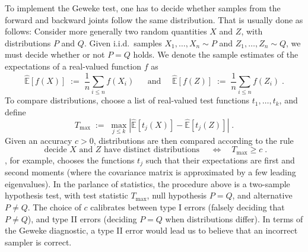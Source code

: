 \documentclass{article}
\begin{document}
To implement the Geweke test, one has to decide whether samples from the forward
and backward joints follow the same distribution. That is usually done as
follows: Consider more generally two 
random quantities $X$ and $Z$, with distributions $P$ and $Q$.
Given i.i.d.\ samples
${X_1,\ldots,X_n\sim P}$ and ${Z_1,\ldots,Z_n\sim Q}$, we must decide
whether or not $P=Q$ holds.
We denote the sample estimates of the expectations of a real-valued
function $f$ as
\begin{equation*}
  \hat{\mathbb{E}}[f(X)]\;:=\;\frac{1}{n}\sum_{i\leq n}f(X_i)\;
  \quad\text{ and }\quad
  \hat{\mathbb{E}}[f(Z)]\;:=\;\frac{1}{n}\sum_{i\leq n}f(Z_i)\;.
\end{equation*}
To compare distributions, choose a list of real-valued test functions
${t_1,\ldots,t_k}$, and define
\begin{equation*}
  T_{\text{max}}\;:=\;\max_{j\leq k}|\hat{\mathbb{E}}[t_j(X)]-\hat{\mathbb{E}}[t_j(Z)]|\;.
\end{equation*}
Given an accuracy ${c>0}$, distributions are then compared 
according to the rule
\begin{equation*}
  \text{ decide }X \text{ and } Z \text{ have distinct distributions }
  \quad\Longleftrightarrow\quad
  T_{\text{max}}\geq c\;.
\end{equation*}
\citet{geweke_getting_2004}, for example, chooses the functions
$t_j$ such that their expectations are first and second moments (where
the covariance matrix is approximated by a few leading eigenvalues).
In the parlance of statistics, the procedure above is a two-sample
hypothesis test, with test statistic $T_{\text{max}}$, null hypothesis
${P=Q}$, and alternative ${P\neq Q}$. The choice of $c$
calibrates between type I errors (falsely deciding that ${P\neq
  Q}$),
and type II errors (deciding ${P=Q}$ when distributions differ). In
terms of the Geweke diagnostic, a type II error would lead us to
believe that an incorrect sampler is correct.
\end{document}
